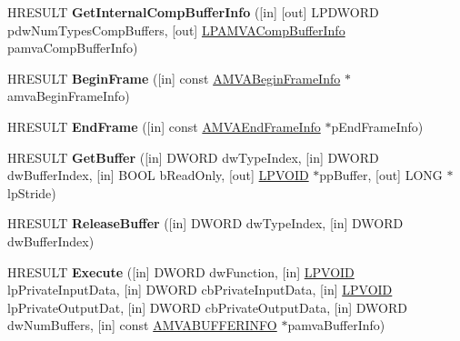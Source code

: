\begin{DoxyCompactItemize}
\item 
\mbox{\label{interface_i_a_m_video_accelerator_acbebb7550edc2960ff5aef3cb59eed88}} 
H\+R\+E\+S\+U\+LT {\bfseries Get\+Internal\+Comp\+Buffer\+Info} (\mbox{[}in\mbox{]} \mbox{[}out\mbox{]} L\+P\+D\+W\+O\+RD pdw\+Num\+Types\+Comp\+Buffers, \mbox{[}out\mbox{]} \hyperlink{struct__tag___a_m_v_a_comp_buffer_info}{L\+P\+A\+M\+V\+A\+Comp\+Buffer\+Info} pamva\+Comp\+Buffer\+Info)
\item 
\mbox{\label{interface_i_a_m_video_accelerator_ae0cd0f13c33e0be055eacf6c6a94e2a3}} 
H\+R\+E\+S\+U\+LT {\bfseries Begin\+Frame} (\mbox{[}in\mbox{]} const \hyperlink{struct__tag___a_m_v_a_begin_frame_info}{A\+M\+V\+A\+Begin\+Frame\+Info} $\ast$amva\+Begin\+Frame\+Info)
\item 
\mbox{\label{interface_i_a_m_video_accelerator_a22f8bcad71f638db3218c5c53b04a945}} 
H\+R\+E\+S\+U\+LT {\bfseries End\+Frame} (\mbox{[}in\mbox{]} const \hyperlink{struct__tag___a_m_v_a_end_frame_info}{A\+M\+V\+A\+End\+Frame\+Info} $\ast$p\+End\+Frame\+Info)
\item 
\mbox{\label{interface_i_a_m_video_accelerator_a63c9814179fe0434040ad4be376f2dbc}} 
H\+R\+E\+S\+U\+LT {\bfseries Get\+Buffer} (\mbox{[}in\mbox{]} D\+W\+O\+RD dw\+Type\+Index, \mbox{[}in\mbox{]} D\+W\+O\+RD dw\+Buffer\+Index, \mbox{[}in\mbox{]} B\+O\+OL b\+Read\+Only, \mbox{[}out\mbox{]} \hyperlink{interfacevoid}{L\+P\+V\+O\+ID} $\ast$pp\+Buffer, \mbox{[}out\mbox{]} L\+O\+NG $\ast$lp\+Stride)
\item 
\mbox{\label{interface_i_a_m_video_accelerator_a0cf1d83892a5f0770ce5c64ad4a9464a}} 
H\+R\+E\+S\+U\+LT {\bfseries Release\+Buffer} (\mbox{[}in\mbox{]} D\+W\+O\+RD dw\+Type\+Index, \mbox{[}in\mbox{]} D\+W\+O\+RD dw\+Buffer\+Index)
\item 
\mbox{\label{interface_i_a_m_video_accelerator_a762a97985600ca4da7a5b350e2f4b927}} 
H\+R\+E\+S\+U\+LT {\bfseries Execute} (\mbox{[}in\mbox{]} D\+W\+O\+RD dw\+Function, \mbox{[}in\mbox{]} \hyperlink{interfacevoid}{L\+P\+V\+O\+ID} lp\+Private\+Input\+Data, \mbox{[}in\mbox{]} D\+W\+O\+RD cb\+Private\+Input\+Data, \mbox{[}in\mbox{]} \hyperlink{interfacevoid}{L\+P\+V\+O\+ID} lp\+Private\+Output\+Dat, \mbox{[}in\mbox{]} D\+W\+O\+RD cb\+Private\+Output\+Data, \mbox{[}in\mbox{]} D\+W\+O\+RD dw\+Num\+Buffers, \mbox{[}in\mbox{]} const \hyperlink{struct__tag___a_m_v_a_b_u_f_f_e_r_i_n_f_o}{A\+M\+V\+A\+B\+U\+F\+F\+E\+R\+I\+N\+FO} $\ast$pamva\+Buffer\+Info)

\end{DoxyCompactItemize}
